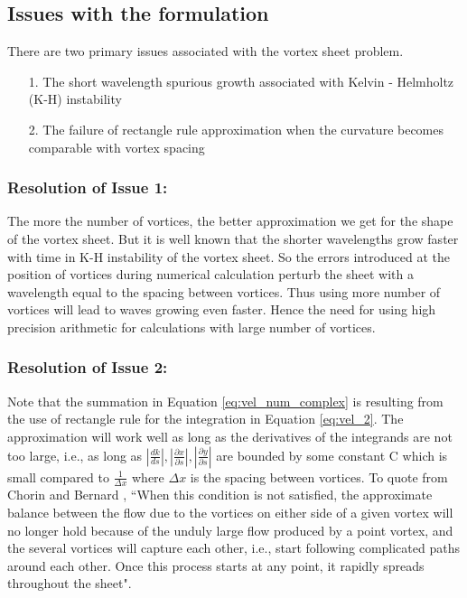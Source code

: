 \documentclass{article}
\begin{document}
\subsection{Issues with the formulation} 
There are two primary issues associated with the vortex sheet problem. 
\begin{itemize}
\item[1.] The short wavelength spurious growth associated with Kelvin - Helmholtz (K-H) instability
\item[2.] The failure of rectangle rule approximation when the curvature becomes comparable with vortex spacing
\end{itemize}

\subsubsection*{Resolution of Issue 1: } 
The more the number of vortices, the better approximation we get for the shape of the vortex sheet. But it is well known that the shorter wavelengths grow faster with time in K-H instability of the vortex sheet. So the errors introduced at the position of vortices during numerical calculation perturb the sheet with a wavelength equal to the spacing between vortices. Thus using more number of vortices will lead to waves growing even faster. Hence the need for using high precision arithmetic for calculations with large number of vortices. 

\subsubsection*{Resolution of Issue 2: }
Note that the summation in Equation \eqref{eq:vel_num_complex} is resulting from the use of rectangle rule for the integration in Equation \eqref{eq:vel_2}. The approximation will work well as long as the derivatives of the integrands are not too large, i.e., as long as $|\frac{dk}{ds}|,|\frac{\partial x}{\partial s}|,|\frac{\partial y}{\partial s}|$ are bounded by some constant C which is small compared to $\frac{1}{\Delta x}$ where $\Delta x$ is the spacing between vortices. To quote from Chorin and Bernard \cite{Chorin}, ``When this condition is not satisfied, the approximate balance between the flow due to the vortices on either side of a given vortex will no longer hold because of the unduly large flow produced by a point vortex, and the several vortices will capture each other, i.e., start following complicated paths around each other. Once this process starts at any point, it rapidly spreads throughout the sheet".
\end{document}
